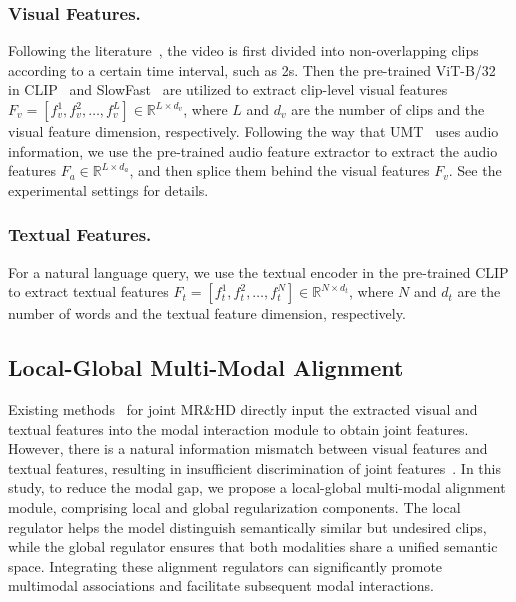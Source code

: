\subsubsection{Visual Features.}
Following the literature~\cite{lei2021detecting}, the video is first divided into non-overlapping clips according to a certain time interval, such as 2s. Then the pre-trained ViT-B/32 in CLIP~\cite{DBLP:conf/icml/RadfordKHRGASAM21} and SlowFast~\cite{DBLP:journals/corr/abs-1812-03982} are utilized to extract clip-level visual features $ F_{v}=\left[f_{v}^{1},f_{v}^{2},\ldots,f_{v}^{L}\right]\in \mathbb{R}^{L\times d_{v}}$, where $L$ and $d_v$ are the number of clips and the visual feature dimension, respectively. Following the way that UMT~\cite{liu2022umt} uses audio information, we use the pre-trained audio feature extractor to extract the audio features $F_a \in \mathbb{R}^{L\times d_{a}} $, and then splice them behind the visual features $F_{v}$. See the experimental settings for details.
\subsubsection{Textual Features.}
For a natural language query, we use the textual encoder in the pre-trained CLIP to extract textual features $ F_{t}=\left[f_{t}^{1},f_{t}^{2},\ldots,f_{t}^{N}\right]\in \mathbb{R}^{N\times d_{t}}$, where $N$ and $d_t$  are the number of words and the textual feature dimension, respectively.

\subsection{Local-Global Multi-Modal Alignment}
Existing methods~\cite{moon2023query,lei2021detecting,liu2022umt} for joint MR\&HD directly input the extracted visual and textual features into the modal interaction module to obtain joint features. However, there is a natural information mismatch between visual features and textual features, resulting in insufficient discrimination of joint features~\cite{10123038}. In this study, to reduce the modal gap, we propose a local-global multi-modal alignment module, comprising local and global regularization components. The local regulator helps the model distinguish semantically similar but undesired clips, while the global regulator ensures that both modalities share a unified semantic space. Integrating these alignment regulators can significantly promote multimodal associations and facilitate subsequent modal interactions.

